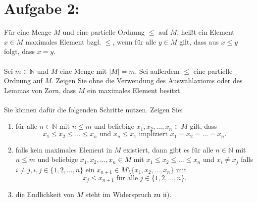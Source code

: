 \documentclass{exam}
\begin{document}
\section*{Aufgabe 2:}
Für eine Menge $M$ und eine partielle Ordnung $\leq$ auf $M$, heißt ein Element $x \in M$ maximales Element bzgl. $\leq$, wenn für alle $y \in M$ gilt, dass aus $x \leq y$ folgt, dass $x = y$.
\\\\
Sei $m \in \mathbb{N}$ und $M$ eine Menge mit $|M| = m$. Sei außerdem $\leq$ eine partielle Ordnung auf $M$. Zeigen Sie ohne die Verwendung des Auswahlaxioms oder des Lemmas von Zorn, dass $M$ ein maximales Element besitzt.
\\\\
Sie können dafür die folgenden Schritte nutzen. Zeigen Sie:
\begin{enumerate}[label=\roman*)]
    \item
          für alle $n \in \mathbb{N}$ mit $n \leq m$ und beliebige $x_1, x_2, \ldots, x_n \in M$ gilt, dass \[
              x_1 \leq x_2 \leq \ldots \leq x_n \text{ und }x_n \leq x_1 \text{ impliziert } x_1 = x_2 = \ldots = x_n.
          \]
    \item
          falls kein maximales Element in $M$ existiert, dann gibt es für alle $n \in \mathbb{N}$ mit $n \leq m$ und beliebige $x_1, x_2, \ldots, x_n \in M$ mit $x_1 \leq x_2 \leq \ldots \leq x_n$ und $x_i \neq x_j$ falls $i \neq j,
              i, j \in \{1, 2, \ldots, n\}$ ein $x_{n+1} \in M \setminus \{x_1, x_2, \ldots, x_n\}$ mit \[
              x_j \leq x_{n+1} \text{ für alle } j \in \{1, 2, \ldots, n\}.
          \]
    \item
          die Endlichkeit von $M$ steht im Widerspruch zu ii).
\end{enumerate}
\end{document}
